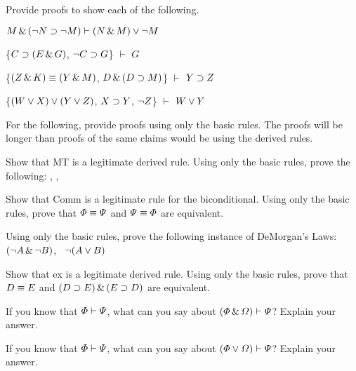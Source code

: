 \solutions
\problempart
\label{pr.solvedSLproofs2}
Provide proofs to show each of the following.
\begin{earg}
\item $M \,\&\, (\neg N \supset \neg M) \vdash (N \,\&\, M) \vee \neg M$
\item \{$C\supset(E\,\&\, G)$, $\neg C \supset G$\} $\vdash$ $G$
\item \{$(Z\,\&\, K)\equiv(Y\,\&\, M)$, $D\,\&\,(D\supset M)$\} $\vdash$ $Y\supset Z$
\item \{$(W \vee X) \vee (Y \vee Z)$, $X\supset Y$, $\neg Z$\} $\vdash$ $W\vee Y$
\end{earg}



\problempart
For the following, provide proofs using only the basic rules. The proofs will be longer than proofs of the same claims would be using the derived rules.
\begin{earg}
\item Show that MT is a legitimate derived rule. Using only the basic rules, prove the following: \metaA{}\eif\metaB{}, \enot\metaB{}, \therefore\ \enot\metaA{}
\item Show that Comm is a legitimate rule for the biconditional. Using only the basic rules, prove that $\varPhi{}\equiv\varPsi{}$ and $\varPsi{}\equiv\varPhi{}$ are equivalent.
\item Using only the basic rules, prove the following instance of DeMorgan's Laws: $(\neg A \,\&\, \neg B)$, \therefore\ $\neg(A \vee B)$
\item Show that {\eiff}{ex} is a legitimate derived rule. Using only the basic rules, prove that $D\equiv E$ and $(D\supset E)\,\&\,(E\supset D)$ are equivalent.
\end{earg}




\problempart
\begin{earg}
\item If you know that $\varPhi{}\vdash\varPsi{}$, what can you say about $(\varPhi{}\,\&\,\varOmega{})\vdash\varPsi{}$? Explain your answer.
\item If you know that $\varPhi{}\vdash\varPsi{}$, what can you say about $(\varPhi{}\vee\varOmega{})\vdash\varPsi{}$? Explain your answer.
\end{earg}




